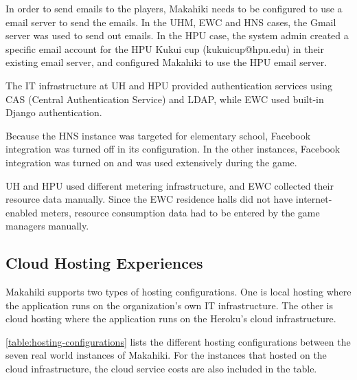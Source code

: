 In order to send emails to the players, Makahiki needs to be configured to use a email server to send the emails. In the UHM, EWC and HNS cases, the Gmail server was used to send out emails. In the HPU case, the system admin created a specific email account for the HPU Kukui cup (kukuicup@hpu.edu) in their existing email server, and configured Makahiki to use the HPU email server. 

The IT infrastructure at UH and HPU provided authentication services using CAS (Central Authentication Service) and LDAP, while EWC used built-in Django authentication.  

Because the HNS instance was targeted for elementary school, Facebook integration was turned off in its configuration. In the other instances, Facebook integration was turned on and was used extensively during the game.

UH and HPU used different metering infrastructure, and EWC collected their resource data manually.  Since the EWC
residence halls did not have internet-enabled meters, resource consumption data had to be entered by
the game managers manually.

\subsection{Cloud Hosting Experiences}
\label{section:cloud-hosting}

Makahiki supports two types of hosting configurations. One is local hosting where the application runs on the organization's own IT infrastructure. The other is cloud hosting where the application runs on the Heroku's cloud infrastructure.

\autoref{table:hosting-configurations} lists the different hosting configurations between the seven real world instances of Makahiki. For the instances that hosted on the cloud infrastructure, the cloud service costs are also included in the table.  

